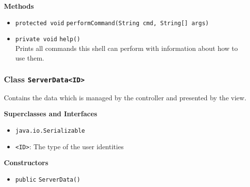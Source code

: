 \textbf{Methods}
\begin{itemize}
\item \lstinline|protected void| \lstinline|performCommand|\lstinline|(String cmd, String[] args)|




\item \lstinline|private void| \lstinline|help|\lstinline|()|\\
Prints all commands this shell can perform with information about how to use them.



\end{itemize}

\subsubsection{Class \lstinline|ServerData<ID>|}
Contains the data which is managed by the controller and presented by the view. \\



\textbf{Superclasses and Interfaces}
\begin{itemize}
\item \lstinline|java.io.Serializable|
\end{itemize}

\begin{itemize}
\item \lstinline|<ID>|: The type of the user identities
\end{itemize}


\textbf{Constructors}
\begin{itemize}
\item \lstinline|public| \lstinline|ServerData|\lstinline|()|




\end{itemize}


